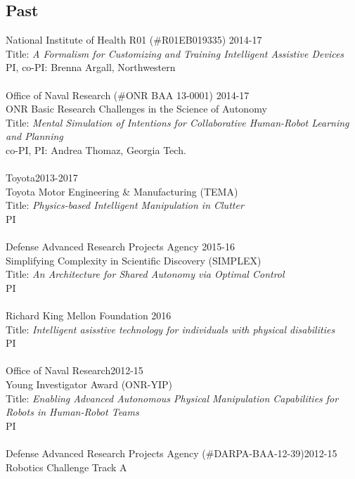 \subsection{Past}
\noindent
National Institute of Health R01 (\#R01EB019335) \hfill 2014-17\\
Title: \textit{A Formalism for Customizing and Training Intelligent Assistive Devices}\\
PI, co-PI: Brenna Argall, Northwestern\\
\\
Office of Naval Research (\#ONR BAA 13-0001) \hfill 2014-17\\
ONR Basic Research Challenges in the Science of Autonomy\\
Title: \textit{Mental Simulation of Intentions for Collaborative Human-Robot Learning and Planning}\\
co-PI, PI: Andrea Thomaz, Georgia Tech.	\\
\\
Toyota\hfill 2013-2017\\
Toyota Motor Engineering \& Manufacturing (TEMA)\\
Title: \textit{Physics-based Intelligent Manipulation in Clutter}\\
PI\\
\\
Defense Advanced Research Projects Agency \hfill 2015-16\\
Simplifying Complexity in Scientific Discovery (SIMPLEX)\\
Title: \textit{An Architecture for Shared Autonomy via Optimal Control}\\
PI\\
\\
Richard King Mellon Foundation \hfill 2016\\
Title: \textit{Intelligent asisstive technology for individuals with physical disabilities}\\
PI\\
\\
Office of Naval Research\hfill 2012-15\\
Young Investigator Award (ONR-YIP)\\
Title: \textit{Enabling Advanced Autonomous Physical Manipulation Capabilities for Robots in Human-Robot Teams}\\
PI\\
\\
Defense Advanced Research Projects Agency (\#DARPA-BAA-12-39)\hfill 2012-15\\
Robotics Challenge Track A\\
